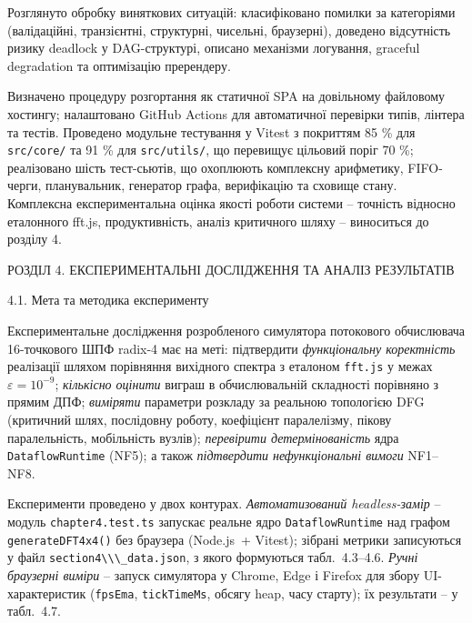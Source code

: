 \documentclass[
]{article}
\newcommand{\passthrough}[1]{#1}
\begin{document}
Розглянуто обробку виняткових ситуацій: класифіковано помилки за
категоріями (валідаційні, транзієнтні, структурні, чисельні, браузерні),
доведено відсутність ризику deadlock у DAG-структурі, описано механізми
логування, graceful degradation та оптимізацію пререндеру.

Визначено процедуру розгортання як статичної SPA на довільному файловому
хостингу; налаштовано GitHub Actions для автоматичної перевірки типів,
лінтера та тестів. Проведено модульне тестування у Vitest з покриттям 85
\% для
\passthrough{\lstinline!src!}\passthrough{\lstinline!/!}\passthrough{\lstinline!core!}\passthrough{\lstinline!/!}
та 91 \% для
\passthrough{\lstinline!src!}\passthrough{\lstinline!/!}\passthrough{\lstinline!utils!}\passthrough{\lstinline!/!},
що перевищує цільовий поріг 70 \%; реалізовано шість тест-сьютів, що
охоплюють комплексну арифметику, FIFO-черги, планувальник, генератор
графа, верифікацію та сховище стану. Комплексна експериментальна оцінка
якості роботи системи -- точність відносно еталонного fft.js,
продуктивність, аналіз критичного шляху -- виноситься до розділу 4.

\protect{}\label{_Toc230737401}{}РОЗДІЛ 4. ЕКСПЕРИМЕНТАЛЬНІ
ДОСЛІДЖЕННЯ ТА АНАЛІЗ РЕЗУЛЬТАТІВ

\protect{}\label{X9901825f527ce598bce4154cca8411ada8f4262}{}4.1.
Мета та методика експерименту

Експериментальне дослідження розробленого симулятора потокового
обчислювача 16-точкового ШПФ radix-4 має на меті: підтвердити
\emph{функціональну коректність} реалізації шляхом порівняння вихідного
спектра з еталоном
\passthrough{\lstinline!fft!}\passthrough{\lstinline!.!}\passthrough{\lstinline!js!}
у межах \(\varepsilon = 10^{- 9}\); \emph{кількісно оцінити} виграш в
обчислювальній складності порівняно з прямим ДПФ; \emph{виміряти}
параметри розкладу за реальною топологією DFG (критичний шлях,
послідовну роботу, коефіцієнт паралелізму, пікову паралельність,
мобільність вузлів); \emph{перевірити детермінованість} ядра
\passthrough{\lstinline!DataflowRuntime!} (NF5); а також
\emph{підтвердити нефункціональні вимоги} NF1--NF8.

Експерименти проведено у двох контурах. \emph{Автоматизований
headless-замір} -- модуль \passthrough{\lstinline!chapter4.test.ts!}
запускає реальне ядро \passthrough{\lstinline!DataflowRuntime!} над
графом \passthrough{\lstinline!generateDFT4x4()!} без браузера
(Node.js~+ Vitest); зібрані метрики записуються у файл
\passthrough{\lstinline!section4\\\_!}\passthrough{\lstinline!data.json!},
з якого формуються табл.~4.3--4.6. \emph{Ручні браузерні виміри} --
запуск симулятора у Chrome, Edge і Firefox для збору UI-характеристик
(\passthrough{\lstinline!fpsEma!}, \passthrough{\lstinline!tickTimeMs!},
обсягу heap, часу старту); їх результати -- у табл.~4.7.
\end{document}
